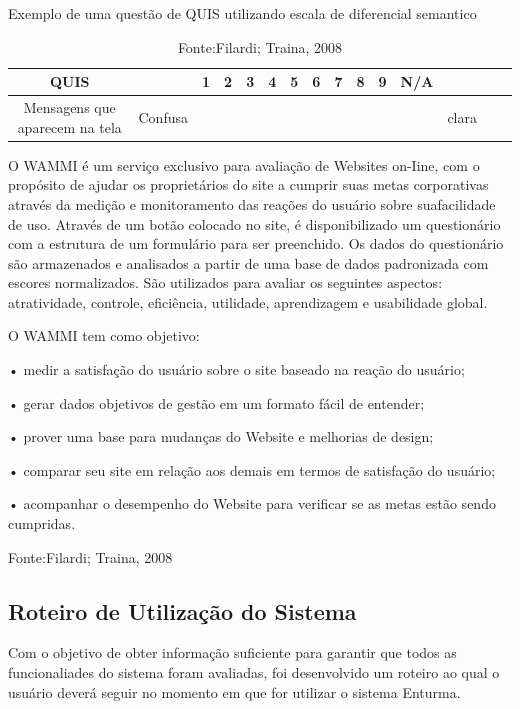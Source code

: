 \begin{table}[H]
	{Exemplo de uma questão de QUIS utilizando escala de diferencial semantico}
	\centering
	\begin{tabular}{|c|c|c|c|c|c|c|c|c|c|c|c|c|c|c|} 

		\hline
		   QUIS &  & 1 & 2 & 3 & 4 & 5 & 6 & 7 & 8 & 9 & N/A &  \\
		\hline
		Mensagens que aparecem na tela & Confusa &  &  &  &  &  &  &  &  &  &  & clara \\ 

		\hline
	\end{tabular}
	\caption {Fonte:Filardi; Traina, 2008}

\end{table}

	O WAMMI é um serviço exclusivo para avaliação de
Websites on-Iine, com o propósito de ajudar os proprietários
do site a cumprir suas metas corporativas através da
medição e monitoramento das reações do usuário sobre
suafacilidade de uso. Através de um botão colocado no site,
é disponibilizado um questionário com a estrutura de um
formulário para ser preenchido. Os dados do questionário
são armazenados e analisados a partir de uma base de dados
padronizada com escores normalizados. São utilizados para
avaliar os seguintes aspectos: atratividade, controle,
eficiência, utilidade, aprendizagem e usabilidade global.
	
	O WAMMI tem como objetivo: 

• medir a satisfação do usuário sobre o site baseado na
reação do usuário;

• gerar dados objetivos de gestão em um formato fácil de
entender;

• prover uma base para mudanças do Website e melhorias
de design;

• comparar seu site em relação aos demais em termos de
satisfação do usuário; 

• acompanhar o desempenho do Website para verificar se
as metas estão sendo cumpridas.

Fonte:Filardi; Traina, 2008

\subsection{Roteiro de Utilização do Sistema} %
\label{sub:roteiro_de_utiliza_o_do_sistema}
	
	Com o objetivo de obter informação suficiente para garantir que todos as funcionaliades do sistema foram avaliadas, foi desenvolvido um roteiro ao qual o usuário deverá seguir no momento em que for utilizar o sistema Enturma.

